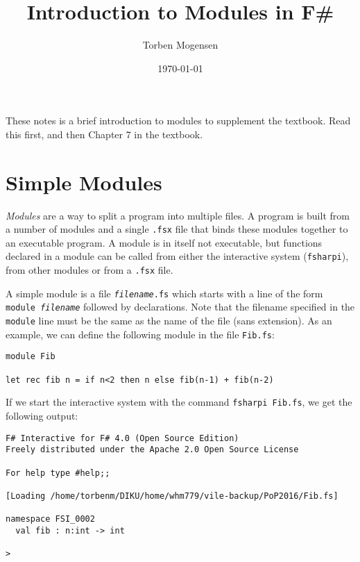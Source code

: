 \documentclass[a4paper]{article}
\begin{document}
\title{Introduction to Modules in F\#}

\author{Torben Mogensen}
\date{\today}

\maketitle

\noindent
These notes is a brief introduction to modules to supplement the
textbook.  Read this first, and then Chapter 7 in the textbook.

\section{Simple Modules}

\emph{Modules} are a way to split a program into multiple files.  A
program is built from a number of modules and a single \texttt{.fsx}
file that binds these modules together to an executable program.  A
module is in itself not executable, but functions declared in a module
can be called from either the interactive system (\texttt{fsharpi}),
from other modules or from a \texttt{.fsx} file.

A simple module is a file \texttt{\emph{filename}.fs} which starts
with a line of the form \texttt{module \emph{filename}} followed by
declarations.  Note that the filename specified in the \texttt{module}
line must be the same as the name of the file (sans extension).  As an
example, we can define the following module in the file
\texttt{Fib.fs}:

\renewcommand{\baselinestretch}{0.9}
\begin{verbatim}
module Fib

let rec fib n = if n<2 then n else fib(n-1) + fib(n-2)
\end{verbatim}
\renewcommand{\baselinestretch}{1}

\noindent
If we start the interactive system with the command \texttt{fsharpi
  Fib.fs}, we get the following output:


\renewcommand{\baselinestretch}{0.9}
\begin{verbatim}
F# Interactive for F# 4.0 (Open Source Edition)
Freely distributed under the Apache 2.0 Open Source License

For help type #help;;

[Loading /home/torbenm/DIKU/home/whm779/vile-backup/PoP2016/Fib.fs]

namespace FSI_0002
  val fib : n:int -> int

> 
\end{verbatim}
\renewcommand{\baselinestretch}{1}
\end{document}
